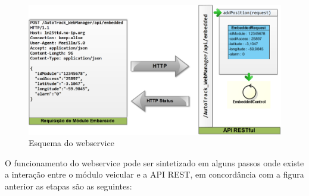 \begin{figure}[!htb]
	\centering
	\includegraphics[width=\textwidth]{figures/RESTMapp.png}
	\caption{Esquema do webservice}
	\label{}
\end{figure}

O funcionamento do webservice pode ser sintetizado em alguns passos onde existe a interação entre o módulo veicular e a API REST, em concordância com a figura anterior as etapas são as seguintes: 

